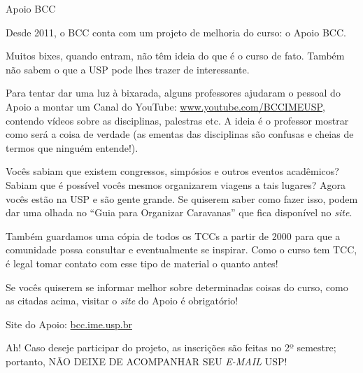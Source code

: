 \begin{subsubsecao}{Apoio BCC}

Desde 2011, o BCC conta com um projeto de melhoria do curso: o Apoio BCC.

Muitos bixes, quando entram, não têm ideia do que é o curso de fato. Também não 
sabem o que a USP pode lhes trazer de interessante.

Para tentar dar uma luz à bixarada, alguns professores ajudaram o pessoal do
Apoio a montar um Canal do YouTube: \url{www.youtube.com/BCCIMEUSP}, contendo
vídeos sobre as disciplinas, palestras etc. A ideia é o professor mostrar como
será a coisa de verdade (as ementas das disciplinas são confusas e cheias de
termos que ninguém entende!).

Vocês sabiam que existem congressos, simpósios e outros eventos acadêmicos?
Sabiam que é possível vocês mesmos organizarem viagens a tais lugares? Agora
vocês estão na USP e são gente grande. Se quiserem saber como fazer isso, podem 
dar uma olhada no ``Guia para Organizar Caravanas'' que fica disponível 
no \textit{site}.

Também guardamos uma cópia de todos os TCCs a partir de 2000 para que a 
comunidade possa consultar e eventualmente se inspirar. Como o curso tem TCC, é 
legal tomar contato com esse tipo de material o quanto antes!

Se vocês quiserem se informar melhor sobre determinadas coisas do curso, como as
citadas acima, visitar o \textit{site} do Apoio é obrigatório!

Site do Apoio: \url{bcc.ime.usp.br}

Ah! Caso deseje participar do projeto, as inscrições são feitas no 2º 
semestre; portanto, NÃO DEIXE DE ACOMPANHAR SEU \textit{E-MAIL} USP!

\end{subsubsecao}
